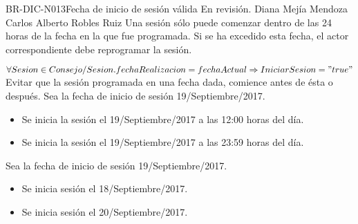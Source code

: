 \begin{BusinessRule}{BR-DIC-N013}{Fecha de inicio de sesión válida}
	{\bcCondition}    %
	{\btTimer}     %
	{\blControlling}    %
	\BRItem[Estado] En revisión.
	 Diana Mejía Mendoza
	 Carlos Alberto Robles Ruiz
	\BRItem[Descripción] Una sesión sólo puede comenzar dentro de las 24 horas de la fecha en la que fue programada. Si se ha excedido esta fecha, el actor correspondiente debe reprogramar la sesión.
	
	\BRItem[Sentencia] $\forall Sesion \in Consejo  /  Sesion.fechaRealizacion= fechaActual  \Rightarrow IniciarSesion="true"$
	\BRItem[Motivacion] Evitar que la sesión programada en una fecha dada, comience antes de ésta o después.
	Sea la fecha de inicio de sesión 19/Septiembre/2017.
	\begin{itemize}
		\item Se inicia la sesión el 19/Septiembre/2017 a las 12:00 horas del día.
		\item Se inicia la sesión el 19/Septiembre/2017 a las 23:59 horas del día.
	\end{itemize}
	Sea la fecha de inicio de sesión 19/Septiembre/2017.
	\begin{itemize}
		\item Se inicia sesión el 18/Septiembre/2017.
		\item Se inicia sesión el 20/Septiembre/2017.
	\end{itemize}
\end{BusinessRule}





